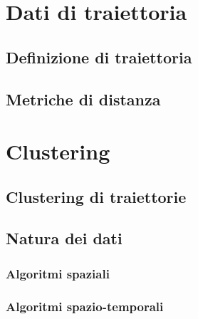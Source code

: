 


\section{Dati di traiettoria}\label{sec:trajectorydata}


\subsection{Definizione di traiettoria}\label{subsec:trajectory-definition}


\subsection{Metriche di distanza}\label{sec:measure}


\section{Clustering}\label{sec:clustering}


\subsection{Clustering di traiettorie}\label{subsec:trajectoryclustering}



\subsection{Natura dei dati}

\subsubsection{Algoritmi spaziali}\label{subsec:spatial-algotithm}


\subsubsection{Algoritmi spazio-temporali}\label{subsec:temporal-algotithm}


